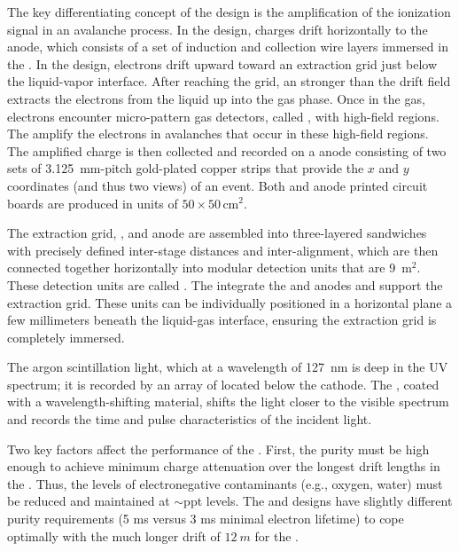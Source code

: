 The key differentiating concept of the  design is the amplification of the ionization signal in an avalanche process. In the  design, charges drift horizontally to the anode, which consists of a set of induction and collection wire layers immersed in the . In the  design, electrons drift upward toward an extraction grid just below the liquid-vapor interface. After reaching the grid, an \efield stronger than the drift field extracts the electrons from the liquid up into the gas phase. Once in the gas, electrons encounter micro-pattern gas detectors, called , with high-field regions. The  amplify the electrons in avalanches that occur in these high-field regions. The amplified charge is then collected and recorded on a \twod anode
consisting of two sets of \SI{3.125}{mm}-pitch gold-plated copper strips that provide the $x$ and $y$ coordinates (and thus two views) of an event. Both  and anode printed circuit boards are produced in units of $50 \times 50\, $cm$^2$. 

The extraction grid, , and anode are assembled into three-layered sandwiches with precisely defined inter-stage distances and inter-alignment,  which are then connected together horizontally into modular detection units that are \num{9}~m$^2$. These detection units are called . The  integrate the  and anodes and support the extraction grid. These units can be individually positioned in a horizontal plane a few millimeters beneath the liquid-gas interface, ensuring the extraction grid is completely immersed. 

The argon scintillation light, which at a wavelength of  \SI{127}{nm} is deep in the UV spectrum; it is recorded by an array of  located below the cathode.  The , coated with a wavelength-shifting material, shifts the light  closer to the visible spectrum and records the time and pulse characteristics of the incident light.

Two key factors affect the performance of the .  First, the  purity must be high enough to achieve minimum charge attenuation over the longest drift lengths in the .  Thus, the levels of electronegative contaminants (e.g., oxygen, water) must be reduced and
maintained at $\sim$ppt levels.  The  and  designs have slightly different purity requirements (5 ms versus 3 ms minimal electron lifetime) to  cope optimally with the much longer drift of $12~m$ for the .

